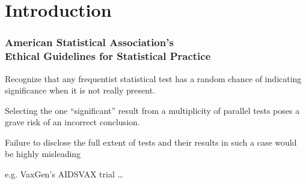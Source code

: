 \documentclass[xcolor={dvipsnames}]{beamer}
\begin{document}
\section{Introduction}

\begin{frame}
\frametitle{American Statistical Association's\\
Ethical Guidelines for Statistical Practice}

Recognize that any frequentist %
statistical test has a random %
chance of indicating significance %
when it is not really present. %
\bigskip

Selecting the one ``significant'' %
result from a multiplicity of parallel  %
tests poses a grave risk of an  %
incorrect conclusion.   %
\bigskip

Failure to disclose the full extent %
of tests and their results in such  %
a case would be highly misleading %
\pause

\bigskip
e.g. VaxGen's AIDSVAX trial \ldots
\end{frame}
\end{document}

